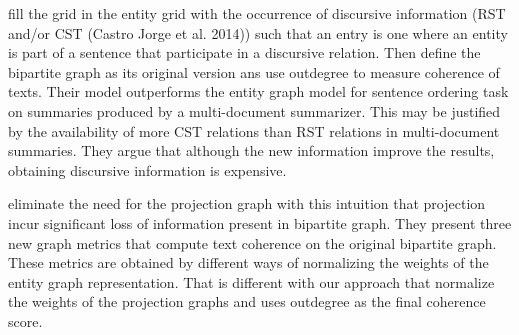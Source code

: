 \cite{dias15}  fill the grid in the entity grid with the occurrence of discursive information
(RST and/or CST \cite{?}(Castro Jorge et al. 2014)) such that an entry is one where an entity is part of a sentence that participate in a discursive relation.
Then define the bipartite graph as its original version ans use outdegree to measure coherence of texts. 
Their model outperforms the entity graph model for sentence ordering task on summaries produced by a multi-document summarizer. 
This may be justified by the availability of more CST relations than RST relations in multi-document summaries.
They argue that although the new information improve the results, obtaining discursive information is expensive. 

\cite{lioma16} eliminate the need for the projection graph with this intuition that projection incur significant loss of information present in bipartite graph.  
They present three new graph metrics that compute text coherence on the original bipartite graph. 
These metrics are obtained by different ways of normalizing the weights of the entity graph representation. 
That is different with our approach that normalize the weights of the projection graphs and uses outdegree as the final coherence score. 

 

